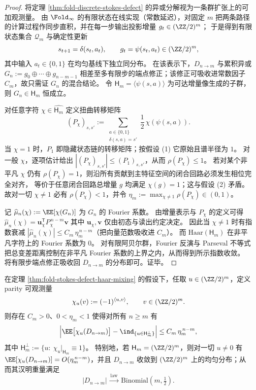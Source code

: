 \begin{proof}
将定理 \ref{thm:fold-discrete-stokes-defect} 的异或分解视为一条群扩张上的可加观测量。
由 \(\Fold_\infty\) 的有限状态在线实现（常数延迟），对固定 \(m\) 把两条路径的计算过程作同步直积，并在每一步输出投影增量
\(
g_t\in(\ZZ/2)^m
\)；
于是得到有限状态集合 \(\mathcal Q_m\) 与确定性更新
\[
s_{t+1}=\delta(s_t,a_t),\qquad g_t=\psi(s_t,a_t)\in(\ZZ/2)^m,
\]
其中输入 \(a_t\in\{0,1\}\) 在均匀基线下独立同分布。
在该表示下，\(D_{n\to m}\) 与累积异或
\(
G_n:=g_0\oplus\cdots\oplus g_{n-m-1}
\)
相差至多有限步的端点修正；该修正可吸收进常数因子 \(C_m\)，故只需证 \(G_n\) 的混合结论。
令 \(\mathsf H_m=\langle\psi(s,a)\rangle\) 为可达增量像生成的子群，则 \(G_n\in\mathsf H_m\) 恒成立。
\par
对任意字符 \(\chi\in\widehat{\mathsf H_m}\) 定义扭曲转移矩阵
\[
(P_\chi)_{s,s'}:=\sum_{\substack{a\in\{0,1\}\\ \delta(s,a)=s'}}\frac12\,\chi(\psi(s,a)).
\]
当 \(\chi=1\) 时，\(P_1\) 即隐藏状态链的转移矩阵；按假设 (1) 它原始且谱半径为 \(1\)。
对一般 \(\chi\)，逐项估计给出 \(|(P_\chi)_{s,s'}|\le (P_1)_{s,s'}\)，从而 \(\rho(P_\chi)\le 1\)。
若对某个非平凡 \(\chi\) 仍有 \(\rho(P_\chi)=1\)，则沿所有贡献到主特征空间的闭合回路必须发生相位完全对齐，
等价于任意闭合回路总增量 \(g\) 均满足 \(\chi(g)=1\)；这与假设 (2) 矛盾。
故对一切 \(\chi\neq 1\) 必有 \(\rho(P_\chi)<1\)，并令 \(\eta_m:=\max_{\chi\neq 1}\rho(P_\chi)\in(0,1)\)。
\par
记 \(\widehat\mu_n(\chi):=\EE[\chi(G_n)]\) 为 \(G_n\) 的 Fourier 系数。
由增量表示与 \(P_\chi\) 的定义可得
\(
\widehat\mu_n(\chi)=\mathbf u_\chi^{\mathsf T}P_\chi^{\,n-m}\mathbf v
\)
其中 \(\mathbf u_\chi,\mathbf v\) 仅由初态与读出约定决定。
因此当 \(\chi\neq 1\) 时有指数衰减 \(|\widehat\mu_n(\chi)|\le C_m\,\eta_m^{\,n-m}\)（把向量范数吸收进 \(C_m\)）。
而 \(\mathrm{Haar}(\mathsf H_m)\) 在非平凡字符上的 Fourier 系数为 \(0\)。
对有限阿贝尔群，Fourier 反演与 Parseval 不等式把总变差距离控制在非平凡 Fourier 系数的上界之内，从而得到所示指数收敛。
将有限步端点修正吸收回 \(D_{n\to m}\) 的分布即可。证毕。
\end{proof}

\begin{corollary}[多尺度缺陷的奇偶可观测量极化与二项式噪声极限]\label{cor:fold-stokes-defect-parity-polarization}
在定理 \ref{thm:fold-stokes-defect-haar-mixing} 的假设下，任取 \(u\in(\ZZ/2)^m\)，定义 parity 可观测量
\[
\chi_u(v):=(-1)^{\langle u,v\rangle},\qquad v\in(\ZZ/2)^m.
\]
则存在 \(C_m>0\)、\(0<\eta_m<1\) 使得对所有 \(n\ge m\) 有
\[
\Bigl|\EE\bigl[\chi_u(D_{n\to m})\bigr]-\ind_{\{u\in \mathsf H_m^\perp\}}\Bigr|
\le C_m\,\eta_m^{\,n-m},
\]
其中 \(\mathsf H_m^\perp:=\{u:\ \chi_u|_{\mathsf H_m}\equiv 1\}\)。
特别地，若 \(\mathsf H_m=(\ZZ/2)^m\)，则对一切 \(u\neq 0\) 有 \(\EE[\chi_u(D_{n\to m})]=O(\eta_m^{\,n-m})\)，并且 \(D_{n\to m}\) 收敛到 \((\ZZ/2)^m\) 上的均匀分布；从而其汉明重量满足
\[
|D_{n\to m}|\ \xrightarrow[]{\mathrm{law}}\ \mathrm{Binomial}\!\left(m,\tfrac12\right).
\]
\end{corollary}

